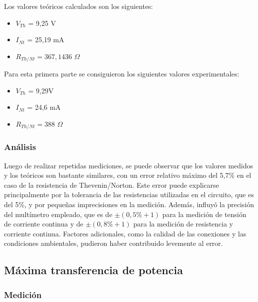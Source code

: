 \documentclass{article}
\begin{document}
                \quad Los valores teóricos calculados son los siguientes:
            	\begin{itemize}
                \item $V_{Th}$ = 9,25 V
                \item $I_{Nt}$ = 25,19 mA
                \item $R_{Th/Nt} = 367,1436$ $\Omega$
                \end{itemize}

                \quad Para esta primera parte se consiguieron los siguientes valores experimentales:
            	\begin{itemize}
                \item $V_{Th}$ = 9,29V
                \item $I_{Nt}$ = 24,6 mA
                \item $R_{Th/Nt} = 388$ $\Omega$
                \end{itemize}

            \subsubsection{Análisis}

            \quad Luego de realizar repetidas mediciones, se puede observar que los valores medidos y los teóricos son bastante similares, 
            con un error relativo máximo del 5,7\% en el caso de la resistencia de Thevenin/Norton. 
            Este error puede explicarse principalmente por la tolerancia de las resistencias utilizadas en el circuito, 
            que es del 5\%, y por pequeñas imprecisiones en la medición. Además, influyó la precisión del multímetro empleado, 
            que es de $\pm(0,5\% + 1)$ para la medición de tensión de corriente continua y de $\pm (0,8\% + 1)$ para la medición 
            de resistencia y corriente continua. 
            Factores adicionales, como la calidad de las conexiones y las condiciones ambientales, pudieron haber contribuido 
            levemente al error.
        \subsection{Máxima transferencia de potencia}

            \subsubsection{Medición}
\end{document}
